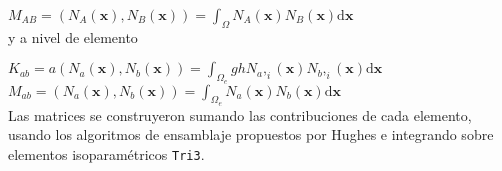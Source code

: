 $M_{AB} = (N_A(\boldsymbol{x}), N_B(\boldsymbol{x})) = \int_{\Omega} N_A(\boldsymbol{x}) N_B(\boldsymbol{x}) \mathrm{d}\boldsymbol{x} $\\

y a  nivel de elemento

$K_{ab} = a(N_a(\boldsymbol{x}), N_b(\boldsymbol{x})) = \int_{\Omega_e} gh N_a,_i(\boldsymbol{x}) N_b,_i(\boldsymbol{x}) \mathrm{d}\boldsymbol{x} $\\

$M_{ab} = (N_a(\boldsymbol{x}), N_b(\boldsymbol{x})) = \int_{\Omega_e} N_a(\boldsymbol{x}) N_b(\boldsymbol{x}) \mathrm{d}\boldsymbol{x} $\\

Las matrices se construyeron sumando las contribuciones de cada elemento, usando los algoritmos de ensamblaje propuestos por Hughes \cite{hughes2000} e integrando sobre elementos isoparam\'etricos \verb;Tri3;.






